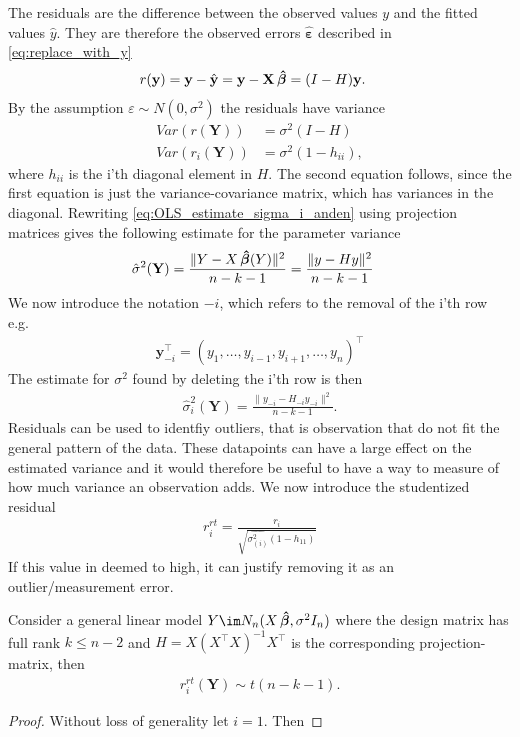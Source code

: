 The residuals are the difference between the observed values $y$ and the fitted values $\hat{y}$. They are therefore the observed errors $\boldsymbol{\hat{\varepsilon}}$ described in \eqref{eq:replace_with_y}
\begin{align*}
    r(\textbf{y}) &= \textbf{y} - \hat{\textbf{y}} = \textbf{y} - \textbf{X} \operatorname{\boldsymbol{\hat{\beta}}} = (I - H) \textbf{y}.
\end{align*}
By the assumption $\varepsilon \sim N(0, \sigma^2)$ the residuals have variance
\begin{align*}
    Var(r(\textbf{Y})) &= \sigma^2 (I - H) \\
    Var(r_i(\textbf{Y})) &= \sigma^2(1 - h_{ii}),
\end{align*}
where $h_{ii}$ is the i'th diagonal element in $H$. The second equation follows, since the first equation is just the variance-covariance matrix, which has variances in the diagonal.
Rewriting \eqref{eq:OLS_estimate_sigma_i_anden} using projection matrices gives the following estimate for the parameter variance
\begin{align*}
    \hat{\sigma}^2(\textbf{Y}) &= \frac{\| Y - X \operatorname{\boldsymbol{\hat{\beta}}} (Y) \|^2 }{n-k-1} = \frac{\| y - H y \|^2}{n-k-1} 
\end{align*}
We now introduce the notation $-i$, which refers to the removal of the i'th row e.g.
\begin{align*}
    \textbf{y}_{-i}^\top = (y_1, \ldots, y_{i-1}, y_{i+1}, \ldots, y_n)^\top
\end{align*}
The estimate for $\sigma^2$ found by deleting the i'th row is then
\begin{align*}
    \hat{\sigma}^2_i(\textbf{Y}) = \frac{\| y_{-i} - H_{-i} y_{-i} \|^2}{n-k-1}.
\end{align*}
Residuals can be used to identfiy outliers, that is observation that do not fit the general pattern of the data. These datapoints can have a large effect on the estimated variance and it would therefore be useful to have a way to measure of how much variance an observation adds. We now introduce the studentized residual
\begin{align*}
    r_i^{rt} = \frac{r_i}{\sqrt{\hat{\sigma^2_{(i)}}(1-h_{11})}}
\end{align*}
If this value in deemed to high, it can justify removing it as an outlier/measurement error. 

\begin{proposition}
    Consider a general linear model $Y \im N_n(X \betahat, \sigma^2 I_n)$ where the design matrix has full rank $k \leq n-2$ and $H = X (X^\top X)^{-1}X^\top$ is the corresponding projection-matrix, then
    \begin{align*}
        r_i^{rt}(\textbf{Y}) \sim t(n-k-1).
    \end{align*}
\end{proposition}
\begin{proof}
    Without loss of generality let $i=1$. Then 
\end{proof}

